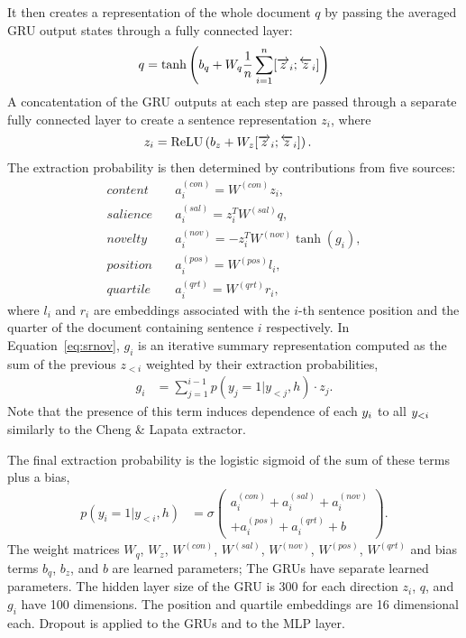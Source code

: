 It then creates a representation
of the whole document $q$ by passing the averaged GRU output states through
a fully connected layer: 
\begin{align}
q = \tanh\left(b_q + W_q\frac{1}{n}\sum_{i=1}^{n} [\overrightarrow{z}_i; \overleftarrow{z}_i] \right)
\end{align}
A concatentation of the GRU outputs at each step
are passed through a separate fully connected layer to create a 
sentence representation $z_i$, where
\begin{align}
    z_i &= \operatorname{ReLU}\left(b_z + W_z [\overrightarrow{z}_i; \overleftarrow{z}_i]\right).
\end{align}
The extraction probability is then determined by contributions from five 
sources:
\begin{align}
    \textit{content} &\quad a^{(con)}_i=W^{(con)} z_i, \\
    \textit{salience}&\quad a^{(sal)}_i = z_i^TW^{(sal)} q, \\
    \textit{novelty}&\quad a^{(nov)}_i = -z_i^TW^{(nov)} \tanh(g_i), \label{eq:srnov} \\
    \textit{position}&\quad a^{(pos)}_i = W^{(pos)} l_i, \\
    \textit{quartile}&\quad a^{(qrt)}_i = W^{(qrt)} r_i,
\end{align}
where $l_i$ and $r_i$ are embeddings associated with the $i$-th sentence
position and the quarter of the document containing sentence $i$ respectively.
In Equation~\ref{eq:srnov}, $g_i$ is an iterative summary representation 
computed as the
sum of the previous $z_{<i}$ weighted by their extraction probabilities,
\begin{align}
g_i & = \sum_{j=1}^{i-1} p(y_j=1|y_{<j},h) \cdot z_j.
\end{align}
Note that the presence of this term induces dependence of each 
$\slabel_i$ to 
all $\slabel_{<i}$ similarly to the Cheng \& Lapata extractor.

The final extraction probability is the logistic sigmoid of the
sum of these terms plus a bias,
\begin{align}
    p(y_i=1|y_{<i}, h) &= \sigma\left(\begin{array}{l}
      a_i^{(con)} + a_i^{(sal)} + a_i^{(nov)} \\
  + a_i^{(pos)}  + a_i^{(qrt)} + b \end{array}\right).
\end{align}
The weight matrices $W_q$, $W_z$, $W^{(con)}$, $W^{(sal)}$, $W^{(nov)}$, $W^{(pos)}$,
$W^{(qrt)}$ and bias terms $b_q$, $b_z$, and $b$ are learned parameters;
The GRUs have separate learned parameters.
The hidden layer size of the GRU is 300 for each direction $z_i$, $q$, and $g_i$ have 100 dimensions. The position and quartile embeddings are 16 dimensional each.
Dropout is applied to the GRUs and to the MLP layer.





